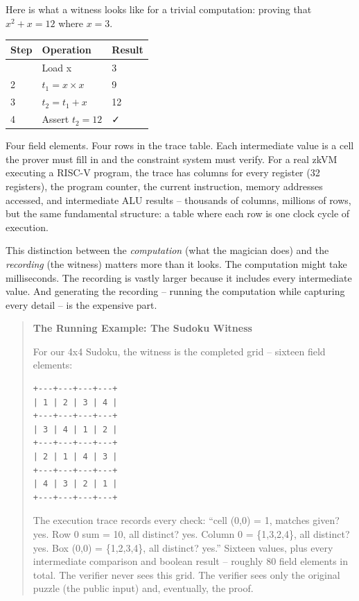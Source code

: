 \documentclass[
  11pt,
  openany]{report}
\renewcommand{\textbf}[1]{{\bfseries\color{MidnightBold}#1}}
\begin{document}
Here is what a witness looks like for a trivial computation: proving that
\(x^2 + x = 12\) where \(x = 3\).

\begin{longtable}[]{@{}lll@{}}
\toprule\noalign{}
Step & Operation & Result \\
\midrule\noalign{}
\arrayrulecolor{MidnightBlue}\midrule\arrayrulecolor{MidnightBorder}
\endhead
\bottomrule\noalign{}
\endlastfoot
1 & Load x & 3 \\
2 & \(t_1 = x \times x\) & 9 \\
3 & \(t_2 = t_1 + x\) & 12 \\
4 & Assert \(t_2 = 12\) & ✓ \\
\end{longtable}

Four field elements. Four rows in the trace table. Each intermediate value is a
cell the prover must fill in and the constraint system must verify. For a real
zkVM executing a RISC-V program, the trace has columns for every register (32
registers), the program counter, the current instruction, memory addresses
accessed, and intermediate ALU results -- thousands of columns, millions of
rows, but the same fundamental structure: a table where each row is one clock
cycle of execution.

This distinction between the \emph{computation} (what the magician does) and the
\emph{recording} (the witness) matters more than it looks. The computation might
take milliseconds. The recording is vastly larger because it includes every
intermediate value. And generating the recording -- running the computation
while capturing every detail -- is the expensive part.

\begin{quote}
\textbf{The Running Example: The Sudoku Witness}

For our 4x4 Sudoku, the witness is the completed grid -- sixteen field elements:

\begin{verbatim}
+---+---+---+---+
| 1 | 2 | 3 | 4 |
+---+---+---+---+
| 3 | 4 | 1 | 2 |
+---+---+---+---+
| 2 | 1 | 4 | 3 |
+---+---+---+---+
| 4 | 3 | 2 | 1 |
+---+---+---+---+
\end{verbatim}

The execution trace records every check: ``cell (0,0) = 1, matches given? yes.
Row 0 sum = 10, all distinct? yes. Column 0 = \{1,3,2,4\}, all distinct? yes.
Box (0,0) = \{1,2,3,4\}, all distinct? yes.'' Sixteen values, plus every
intermediate comparison and boolean result -- roughly 80 field elements in
total. The verifier never sees this grid. The verifier sees only the original
puzzle (the public input) and, eventually, the proof.
\end{quote}
\end{document}
